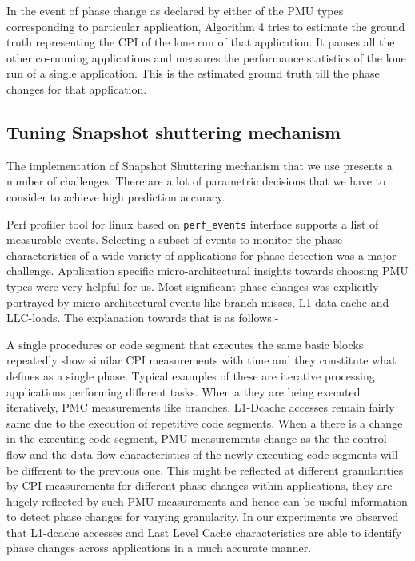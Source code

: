 \documentclass[pageno]{jpaper}
\begin{document}
In the event of phase change as declared by either of the PMU types corresponding to  particular application, Algorithm 4 tries to estimate the ground truth representing the CPI of the lone run of that application. It pauses all the other co-running applications and measures the performance statistics of the lone run of a single application. This is the estimated ground truth till the phase changes for that application.
\subsection{Tuning Snapshot shuttering mechanism}
\label{subsec:TuningSnapshotshutteringmechanism}

The implementation of Snapshot Shuttering mechanism that we use presents a number of challenges. There are a lot of parametric decisions that we have to consider to achieve high prediction accuracy.

Perf profiler tool for linux based on \texttt{perf\_events} interface supports a list of measurable events. Selecting a subset of events to monitor the phase characteristics of a wide variety of applications for phase detection was a major challenge. Application specific micro-architectural insights towards choosing PMU types were very helpful for us. Most significant phase changes was explicitly portrayed by micro-architectural events like branch-misses, L1-data cache and LLC-loads. The explanation towards that is as follows:-

A single procedures or code segment that executes the same basic blocks repeatedly show similar CPI measurements with time and they constitute what defines as a single phase. Typical examples of these are iterative processing applications performing different tasks. When a they are being executed iteratively, PMC measurements like branches, L1-Dcache accesses remain fairly same due to the execution of repetitive code segments. When a there is a change in the executing code segment, PMU measurements change as the the control flow and the data flow characteristics of the newly executing code segments will be different to the previous one. This might be reflected at different granularities by CPI measurements for different phase changes within applications, they are hugely reflected  by such PMU measurements and hence can be useful information to detect phase changes for varying granularity. In our experiments we observed that L1-dcache accesses and Last Level Cache characteristics are able to identify phase changes across applications in a much accurate manner.
\end{document}
